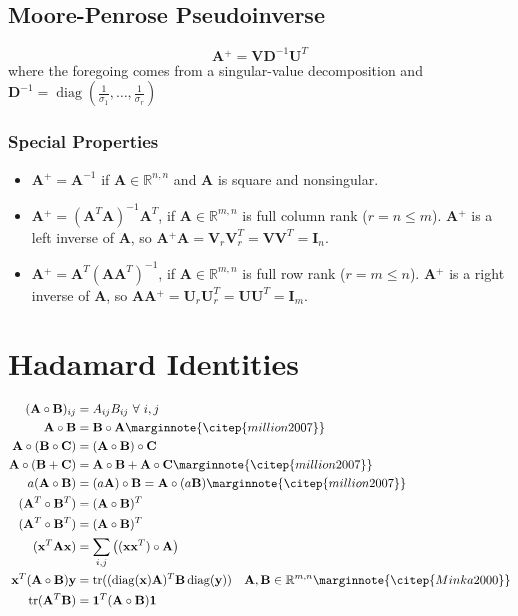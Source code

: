 \documentclass{book}
\newcommand{\mA}{\mathbf{A}}
\newcommand{\mB}{\mathbf{B}}
\newcommand{\mC}{\mathbf{C}}
\newcommand{\mD}{\mathbf{D}}
\newcommand{\mI}{\mathbf{I}}
\newcommand{\mU}{\mathbf{U}}
\newcommand{\mV}{\mathbf{V}}
\newcommand{\vx}{\mathbf{x}}
\newcommand{\vy}{\mathbf{y}}
\DeclareMathOperator{\diag}{diag}
\DeclareMathOperator{\trace}{tr}
\newcommand{\sRmn}{\mathbb{R}^{m,n}}
\newcommand{\sRnn}{\mathbb{R}^{n,n}}
\newcommand{\pinv}{\!^+}
\newcommand{\eqcite}[1]{\marginnote{\citep{#1}}}
\begin{document}
\section{Moore-Penrose Pseudoinverse}
\begin{equation}
\mA\pinv = \mV \mD^{-1} \mU^T
\end{equation}
where the foregoing comes from a singular-value decomposition and $\mD^{-1}=\diag(\frac{1}{\sigma_1},\ldots,\frac{1}{\sigma_r})$

\subsection*{Special Properties}
\begin{itemize}
\item $\mA\pinv=\mA^{-1}$ if $\mA\in\sRnn$ and $\mA$ is square and nonsingular.
\item $\mA\pinv=(\mA^T\mA)^{-1}\mA^T$, if $\mA\in\sRmn$ is full column rank ($r=n\le m$). $\mA\pinv$ is a left inverse of $\mA$, so $\mA\pinv\mA=\mV_r\mV_r^T=\mV\mV^T=\mI_n$.
\item $\mA\pinv=\mA^T(\mA\mA^T)^{-1}$, if $\mA\in\sRmn$ is full row rank ($r=m\le n$). $\mA\pinv$ is a right inverse of $\mA$, so $\mA\mA\pinv=\mU_r\mU_r^T=\mU\mU^T=\mI_m$.
\end{itemize} %



\chapter{Hadamard Identities}

\begin{align}
(\mA\circ\mB)_{ij}    &= A_{ij}B_{ij}~\forall~i,j                                     \\
\mA\circ\mB           &= \mB\circ\mA                             \eqcite{million2007} \\
\mA\circ(\mB\circ\mC) &= (\mA\circ\mB)\circ\mC                                        \\
\mA\circ(\mB+\mC)     &= \mA\circ\mB+\mA\circ\mC                 \eqcite{million2007} \\
a(\mA\circ\mB)        &= (a\mA)\circ\mB =\mA\circ(a\mB)          \eqcite{million2007} \\
(\mA^T\circ\mB^T)     &= (\mA\circ\mB)^T                                              \\
(\mA^T\circ\mB^T)     &= (\mA\circ\mB)^T                                              \\
(\vx^T \mA \vx)       &= \sum_{i,j}\big((\vx \vx^T)\circ\mA\big)                      \\
\vx^T(\mA\circ\mB)\vy &= \trace((\diag(\vx)\mA)^T \mB\diag(\vy))~~~\mA,\mB\in\sRmn \eqcite{Minka2000}   \\
\trace(\mA^T\mB)      &= \mathbf{1}^T(\mA\circ\mB)\mathbf{1}                          
\end{align}
\end{document}

